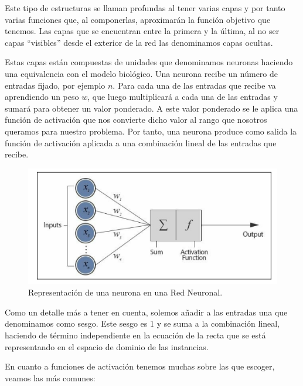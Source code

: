 Este tipo de estructuras se llaman profundas al tener varias capas y por tanto varias funciones que, al componerlas, aproximarán la función objetivo que tenemos. Las capas que se encuentran entre la primera y la última, al no ser capas ``visibles'' desde el exterior de la red las denominamos capas ocultas.

Estas capas están compuestas de unidades que denominamos neuronas haciendo una equivalencia con el modelo biológico. Una neurona recibe un número de entradas fijado, por ejemplo $n$. Para cada una de las entradas que recibe va aprendiendo un peso $w$, que luego multiplicará a cada una de las entradas y sumará para obtener un valor ponderado. A este valor ponderado se le aplica una función de activación que nos convierte dicho valor al rango que nosotros queramos para nuestro problema. Por tanto, una neurona produce como salida la función de activación aplicada a una combinación lineal de las entradas que recibe.

\begin{figure}[H]
	\centering
	\includegraphics[scale=0.65]{imagenes/neurona.png}
	\caption{Representación de una neurona en una Red Neuronal.}
	\label{img:neurona}
\end{figure}

Como un detalle más a tener en cuenta, solemos añadir a las entradas una que denominamos como sesgo. Este sesgo es 1 y se suma a la combinación lineal, haciendo de término independiente en la ecuación de la recta que se está representando en el espacio de dominio de las instancias.

En cuanto a funciones de activación tenemos muchas sobre las que escoger, veamos las más comunes:

